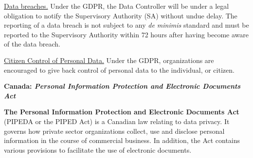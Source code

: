 \documentclass{mcmthesis}
\begin{document}
\underline{Data breaches.}
Under the GDPR, the Data Controller will be under a legal obligation to notify the Supervisory Authority (SA) without undue delay. The reporting of a data breach is not subject to any \emph{de minimis} standard and must be reported to the Supervisory Authority within 72 hours after having become aware of the data breach. 



\underline{Citizen Control of Personal Data.}
Under the GDPR, organizations are encouraged to give back control of personal data to the individual, or citizen. %

\textbf{Canada: \emph{Personal Information Protection and Electronic Documents Act}} 

\textbf{The Personal Information Protection and Electronic Documents Act} (PIPEDA or the PIPED Act) is a Canadian law relating to data privacy. It governs how private sector organizations collect, use and disclose personal information in the course of commercial business. In addition, the Act contains various provisions to facilitate the use of electronic documents. 
\end{document}
